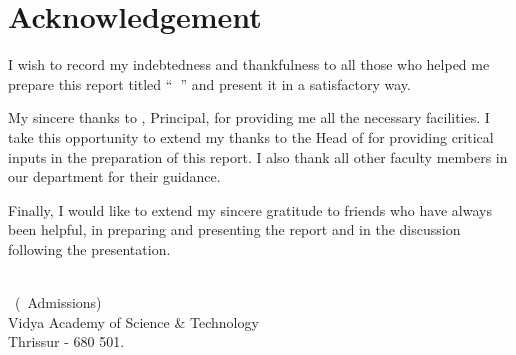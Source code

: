 %
%
%


%
\chapter*{\centering Acknowledgement}
%


\par
\hspace{0.9cm}
\vspace {.2cm}
\par
\hspace{.35cm}I wish to record my indebtedness and thankfulness 
to all those who helped me prepare this report titled ``{\bf \vtitle\ }''  and present it in a satisfactory way.
\vspace{0.2cm}
\par
\hspace{0.35cm}My sincere thanks to {\bf \vprincipal}, Principal, for providing me all the necessary facilities. I take this opportunity to extend my thanks to {\bf \vhod} the Head of {\bf \vdept} for providing critical inputs in the preparation of this report. I also thank all other faculty members in our department for their guidance.
\vspace{.2cm}
\par 
\hspace{.35cm}Finally, I would like to extend my sincere gratitude to friends who have always been helpful, in preparing and presenting the report and in the discussion following the presentation.
\begin{flushright}
{\vauthor}\\

\vclass\  (\vadmissionyear\  Admissions)\\
Vidya Academy of Science \& Technology\\
\vmonth  \hfill Thrissur - 680 501.
\end{flushright}